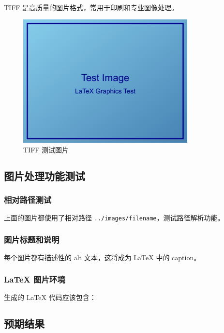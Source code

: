 \documentclass[UTF8, a4paper, 12pt]{ctexart}
\begin{document}
TIFF 是高质量的图片格式，常用于印刷和专业图像处理。


\begin{figure}[H]
    \centering
    \includegraphics[width=0.8\textwidth]{../../tests/images/test_image.tiff}
    \caption{TIFF 测试图片}
    \label{fig:tiff_____}
\end{figure}



\subsection{图片处理功能测试}


\subsubsection{相对路径测试}


上面的图片都使用了相对路径 \texttt{../images/filename}，测试路径解析功能。


\subsubsection{图片标题和说明}


每个图片都有描述性的 alt 文本，这将成为 LaTeX 中的 caption。


\subsubsection{LaTeX 图片环境}


生成的 LaTeX 代码应该包含：

\subsection{预期结果}
\end{document}
